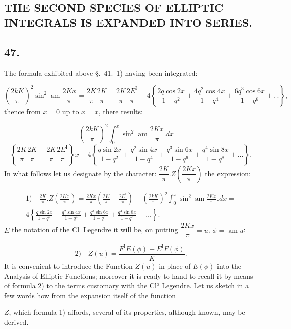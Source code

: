 \documentclass{article}
\begin{document}
\subsection*{THE SECOND SPECIES OF ELLIPTIC INTEGRALS IS EXPANDED INTO SERIES.}

\subsection*{47.}

The formula exhibited above §.\ 41.\ 1) having been integrated:

\[
\left(\frac{2kK}{\pi}\right)^{2}\sin^{2}\operatorname{am}\frac{2Kx}{\pi}=\frac{2K}{\pi}\frac{2K}{\pi}-\frac{2K}{\pi}\frac{2E^{\mathrm{I}}}{\pi}-4\left\{\frac{2q\cos2x}{1-q^{2}}+\frac{4q^{2}\cos4x}{1-q^{4}}+\frac{6q^{3}\cos6x}{1-q^{6}}+.\,.\right\},
\]
thence from $x=0$ up to $x=x$, there results:

\[
\left(\frac{2kK}{\pi}\right)^{2}\int_{0}^{x}\sin^{2}\operatorname{am}\frac{2Kx}{\pi}.dx=
\]
\[
\left\{\frac{2K}{\pi}\frac{2K}{\pi}-\frac{2K}{\pi}\frac{2E^{\mathrm{I}}}{\pi}\right\}x-4\left\{\frac{q\sin2x}{1-q^{2}}+\frac{q^{2}\sin4x}{1-q^{4}}+\frac{q^{3}\sin6x}{1-q^{6}}+\frac{q^{4}\sin8x}{1-q^{8}}+\ldots\right\}.
\]
In what follows let us designate by the character: $\dfrac{2K}{\pi}.Z\left(\dfrac{2Kx}{\pi}\right)$ the expression:

\[
\begin{gathered}
\text{1)}\quad\frac{2K}{\pi}.Z\left(\frac{2Kx}{\pi}\right)=\frac{2Kx}{\pi}\left(\frac{2K}{\pi}-\frac{2E^{\mathrm{I}}}{\pi}\right)-\left(\frac{2kK}{\pi}\right)^{2}\int_{0}^{x}\sin^{2}\operatorname{am}\frac{2Kx}{\pi}.dx=\\[1ex]
4\left\{\frac{q\sin2x}{1-q^{2}}+\frac{q^{2}\sin4x}{1-q^{4}}+\frac{q^{3}\sin6x}{1-q^{6}}+\frac{q^{4}\sin8x}{1-q^{8}}+\ldots\right\}.
\end{gathered}
\]
$E$ the notation of the Cl$^{\mathrm{i}}$ Legendre it will be, on putting $\dfrac{2Kx}{\pi}=u$, $\phi=\operatorname{am}u$:

\[
\text{2)}\quad Z(u)=\frac{F^{\mathrm{I}}E(\phi)-E^{\mathrm{I}}F(\phi)}{K}.
\]
It is convenient to introduce the Function $Z(u)$ in place of $E(\phi)$ into the Analysis of Elliptic Functions; moreover it is ready to hand to recall it by means of formula 2) to the terms customary with the Cl$^{\mathrm{o}}$ Legendre. Let us sketch in a few words how from the expansion itself of the function

$Z$, which formula 1) affords, several of its properties, although known, may be derived.
\end{document}
